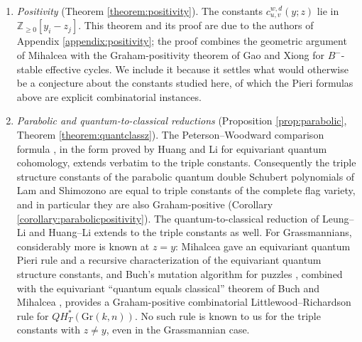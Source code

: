 \documentclass{amsart}
\theoremstyle{definition}
\theoremstyle{remark}
\numberwithin{equation}{section}
\begin{document}
\begin{enumerate}
\item \emph{Positivity} (Theorem \ref{theorem:positivity}). The constants $c_{u,v}^{w,d}(y;z)$ lie in $\mathbb Z_{\geq0}[y_i-z_j]$. This theorem and its proof are due to the authors of Appendix \ref{appendix:positivity}; the proof combines the geometric argument of Mihalcea with the Graham-positivity theorem of Gao and Xiong for $B^-$-stable effective cycles. We include it because it settles what would otherwise be a conjecture about the constants studied here, of which the Pieri formulas above are explicit combinatorial instances.
\item \emph{Parabolic and quantum-to-classical reductions} (Proposition \ref{prop:parabolic}, Theorem \ref{theorem:quantclassz}). The Peterson--Woodward comparison formula \cite{woodward2005d}, in the form proved by Huang and Li \cite{huang2015equivariant} for equivariant quantum cohomology, extends verbatim to the triple constants. Consequently the triple structure constants of the parabolic quantum double Schubert polynomials of Lam and Shimozono are equal to triple constants of the complete flag variety, and in particular they are also Graham-positive (Corollary \ref{corollary:parabolicpositivity}). The quantum-to-classical reduction of Leung--Li and Huang--Li extends to the triple constants as well. For Grassmannians, considerably more is known at $z=y$: Mihalcea \cite{mihalcea2006equivariant} gave an equivariant quantum Pieri rule and a recursive characterization of the equivariant quantum structure constants, and Buch's mutation algorithm for puzzles \cite{buch2015mutations}, combined with the equivariant ``quantum equals classical'' theorem of Buch and Mihalcea \cite{buch2011qkgrass}, provides a Graham-positive combinatorial Littlewood--Richardson rule for $QH_T^*(\mathrm{Gr}(k,n))$. No such rule is known to us for the triple constants with $z\neq y$, even in the Grassmannian case.

\end{enumerate}
\end{document}
